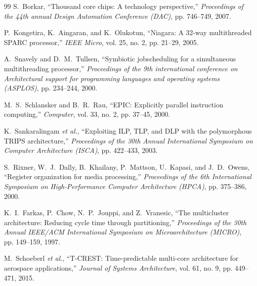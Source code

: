 \documentclass[twocolumn]{article}
\begin{document}
\begin{thebibliography}{99}
S.~Borkar,
``Thousand core chips: A technology perspective,''
\emph{Proceedings of the 44th annual Design Automation Conference (DAC)}, pp. 746--749, 2007.

P.~Kongetira, K.~Aingaran, and K.~Olukotun,
``Niagara: A 32-way multithreaded SPARC processor,''
\emph{IEEE Micro}, vol. 25, no. 2, pp. 21--29, 2005.

A.~Snavely and D.~M.~Tullsen,
``Symbiotic jobscheduling for a simultaneous multithreading processor,''
\emph{Proceedings of the 9th international conference on Architectural support for programming languages and operating systems (ASPLOS)}, pp. 234--244, 2000.

M.~S.~Schlansker and B.~R.~Rau,
``EPIC: Explicitly parallel instruction computing,''
\emph{Computer}, vol. 33, no. 2, pp. 37--45, 2000.

K.~Sankaralingam \emph{et al.},
``Exploiting ILP, TLP, and DLP with the polymorphous TRIPS architecture,''
\emph{Proceedings of the 30th Annual International Symposium on Computer Architecture (ISCA)}, pp. 422--433, 2003.

S.~Rixner, W.~J.~Dally, B.~Khailany, P.~Mattson, U.~Kapasi, and J.~D.~Owens,
``Register organization for media processing,''
\emph{Proceedings of the 6th International Symposium on High-Performance Computer Architecture (HPCA)}, pp. 375--386, 2000.

K.~I.~Farkas, P.~Chow, N.~P.~Jouppi, and Z.~Vranesic,
``The multicluster architecture: Reducing cycle time through partitioning,''
\emph{Proceedings of the 30th Annual IEEE/ACM International Symposium on Microarchitecture (MICRO)}, pp. 149--159, 1997.

M.~Schoeberl \emph{et al.},
``T-CREST: Time-predictable multi-core architecture for aerospace applications,''
\emph{Journal of Systems Architecture}, vol. 61, no. 9, pp. 449--471, 2015.


\end{thebibliography}
\end{document}
